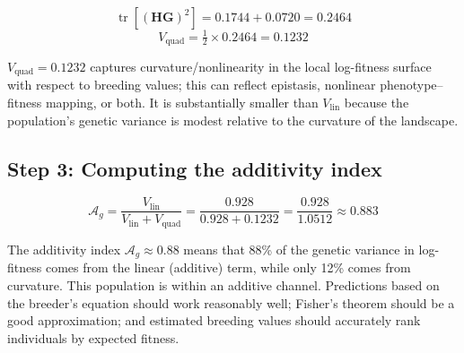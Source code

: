\documentclass[9pt,twocolumn,twoside,lineno]{gsajnl}
\newcommand{\mat}[1]{\mathbf{#1}}
\newcommand{\tr}{\ensuremath{\operatorname{tr}}\xspace}
\newcommand{\Ag}{\ensuremath{\mathcal{A}_{g}}\xspace}
\newcommand{\Vlin}{\ensuremath{V_{\text{lin}}}\xspace}
\newcommand{\Vquad}{\ensuremath{V_{\text{quad}}}\xspace}
\begin{document}
\begin{equation}
\tr[(\mat{H}\mat{G})^2] = 0.1744 + 0.0720 = 0.2464
\end{equation}
\begin{equation}
\Vquad = \tfrac{1}{2} \times 0.2464 = 0.1232
\end{equation}

$\Vquad = 0.1232$ captures curvature/nonlinearity in the local log-fitness surface with respect to breeding values; this can reflect epistasis, nonlinear phenotype–fitness mapping, or both. It is substantially smaller than $\Vlin$ because the population's genetic variance is modest relative to the curvature of the landscape.

\subsection{Step 3: Computing the additivity index}

\begin{equation}
\Ag = \frac{\Vlin}{\Vlin + \Vquad} = \frac{0.928}{0.928 + 0.1232} = \frac{0.928}{1.0512} \approx 0.883
\end{equation}

The additivity index $\Ag \approx 0.88$ means that 88\% of the genetic variance in log-fitness comes from the linear (additive) term, while only 12\% comes from curvature. This population is within an additive channel. Predictions based on the breeder's equation should work reasonably well; Fisher's theorem should be a good approximation; and estimated breeding values should accurately rank individuals by expected fitness.
\end{document}
